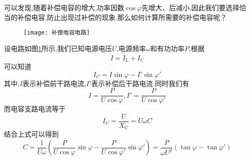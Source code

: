 可以发现,随着补偿电容的增大,功率因数$\cos \varphi $先增大、后减小,因此我们要选择恰当的补偿电容,防止出现过补偿的现象.那么如何计算所需要的补偿电容呢？

\begin{figure}[htbp]
	\centering
	\texttt{[image: 补偿电容电路]}
	\caption{}
	\label{fig:补偿电容电路}
\end{figure}

\Par 设电路如图\ref{fig:补偿电容电路}所示,我们已知电源电压$U$,电源频率$\omega $和有功功率$P$,根据
\begin{equation*}
    \dot{I}=\dot{I}_{\mathrm{L}}+\dot{I}_{\mathrm{C}}
\end{equation*}
可以知道
\begin{equation*}
    I_C=I\sin \varphi -I'\sin \varphi '
\end{equation*}
其中,$I$表示补偿前干路电流,$I'$表示补偿后干路电流.同时我们有
\begin{equation*}
    I=\frac{P}{U\cos \varphi},I'=\frac{P}{U\cos \varphi '}
\end{equation*}
而电容支路电流等于
\begin{equation*}
    I_C=\frac{U}{X_{\mathrm{C}}}=U\omega C
\end{equation*}
结合上式可以得到
\begin{equation}
    C=\frac{1}{U\omega}\left( \frac{P}{U\cos \varphi}\sin \varphi -\frac{P}{U\cos \varphi '}\sin \varphi ' \right) =\frac{P}{\omega U^2}\left( \tan \varphi -\tan \varphi ' \right) 
\end{equation}




